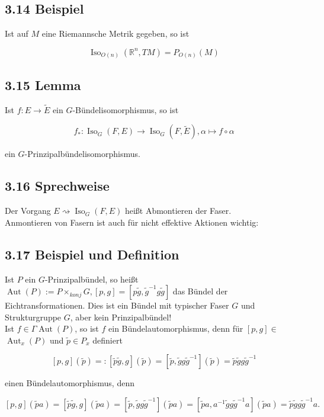 \documentclass[10pt, letterpaper]{article}
\begin{document}
\subsection*{3.14 Beispiel}
Ist auf $M$ eine Riemannsche Metrik gegeben, so ist

$$
\operatorname{Iso}_{O(n)}\left(\mathbb{R}^{n}, T M\right)=P_{O(n)}(M)
$$

\subsection*{3.15 Lemma}
Ist $f: E \rightarrow \tilde{E}$ ein $G$-Bündelisomorphismus, so ist

$$
f_{*}: \operatorname{Iso}_{G}(F, E) \rightarrow \operatorname{Iso}_{G}(F, \tilde{E}), \alpha \mapsto f \circ \alpha
$$

ein $G$-Prinzipalbündelisomorphismus.

\subsection*{3.16 Sprechweise}
Der Vorgang $E \rightsquigarrow \operatorname{Iso}_{G}(F, E)$ heißt Abmontieren der Faser.\\
Anmontieren von Fasern ist auch für nicht effektive Aktionen wichtig:

\subsection*{3.17 Beispiel und Definition}
Ist $P$ ein $G$-Prinzipalbündel, so heißt $\operatorname{Aut}(P):=P \times_{k o n j} G,[p, g]=\left[p \tilde{g}, \tilde{g}^{-1} g \tilde{g}\right]$ das Bündel der Eichtransformationen. Dies ist ein Bündel mit typischer Faser $G$ und Strukturgruppe $G$, aber kein Prinzipalbündel!\\
Ist $f \in \Gamma \operatorname{Aut}(P)$, so ist $f$ ein Bündelautomorphismus, denn für $[p, g] \in$ $\operatorname{Aut}_{x}(P)$ und $\tilde{p} \in P_{x}$ definiert

$$
[p, g](\tilde{p})=:[\tilde{p} \tilde{g}, g](\tilde{p})=\left[\tilde{p}, \tilde{g} g \tilde{g}^{-1}\right](\tilde{p})=\tilde{p} \tilde{g} g \tilde{g}^{-1}
$$

einen Bündelautomorphismus, denn

$$
[p, g](\tilde{p} a)=[\tilde{p} \tilde{g}, g](\tilde{p} a)=\left[\tilde{p}, \tilde{g} g \tilde{g}^{-1}\right](\tilde{p} a)=\left[\tilde{p} a, a^{-1} \tilde{g} g \tilde{g}^{-1} a\right](\tilde{p} a)=\tilde{p} \tilde{g} g \tilde{g}^{-1} a .
$$
\end{document}
